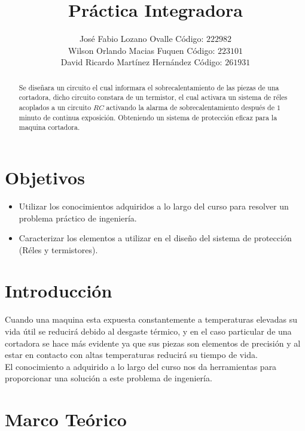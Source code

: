 \documentclass[twocolumn]{IEEEtran}
\begin{document}
\title{Práctica Integradora}
\author{José Fabio Lozano Ovalle Código: $222982$\\
	Wilson Orlando Macias Fuquen Código: $223101$\\
	David Ricardo Martínez Hernández Código: $261931$}
\maketitle
{}
\begin{abstract}
 Se diseñara un circuito el cual informara el sobrecalentamiento de las piezas de una cortadora, dicho circuito constara de un termistor, el cual activara un sistema de réles acoplados a un circuito $RC$ activando la alarma de sobrecalentamiento después de $1$ minuto de continua exposición. Obteniendo un sistema de protección eficaz para la maquina cortadora.
\end{abstract}

\section{Objetivos}
\begin{itemize}
 \item Utilizar los conocimientos adquiridos a lo largo del curso para resolver un problema práctico de ingeniería.
 \item Caracterizar los elementos a utilizar en el diseño del sistema de protección (Réles y termistores).
\end{itemize}

\section{Introducción}
\noindent
Cuando una maquina esta expuesta constantemente a temperaturas elevadas su vida útil se reducirá debido al desgaste térmico, y en el caso particular de una cortadora se hace más evidente ya que sus piezas son elementos de precisión y al estar en contacto con altas temperaturas reducirá su tiempo de vida.\\
El conocimiento a adquirido a lo largo del curso nos da herramientas para proporcionar una solución a este problema de ingeniería.

\section{Marco Teórico}
\end{document}
